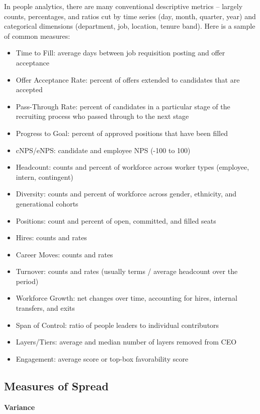 \documentclass[]{book}
\providecommand{\tightlist}{%
  \setlength{\itemsep}{0pt}\setlength{\parskip}{0pt}}
\begin{document}
In people analytics, there are many conventional descriptive metrics -- largely counts, percentages, and ratios cut by time series (day, month, quarter, year) and categorical dimensions (department, job, location, tenure band). Here is a sample of common measures:

\begin{itemize}
\tightlist
\item
  Time to Fill: average days between job requisition posting and offer acceptance
\item
  Offer Acceptance Rate: percent of offers extended to candidates that are accepted
\item
  Pass-Through Rate: percent of candidates in a particular stage of the recruiting process who passed through to the next stage
\item
  Progress to Goal: percent of approved positions that have been filled
\item
  cNPS/eNPS: candidate and employee NPS (-100 to 100)
\item
  Headcount: counts and percent of workforce across worker types (employee, intern, contingent)
\item
  Diversity: counts and percent of workforce across gender, ethnicity, and generational cohorts
\item
  Positions: count and percent of open, committed, and filled seats
\item
  Hires: counts and rates
\item
  Career Moves: counts and rates
\item
  Turnover: counts and rates (usually terms / average headcount over the period)
\item
  Workforce Growth: net changes over time, accounting for hires, internal transfers, and exits
\item
  Span of Control: ratio of people leaders to individual contributors
\item
  Layers/Tiers: average and median number of layers removed from CEO
\item
  Engagement: average score or top-box favorability score
\end{itemize}

\hypertarget{measures-of-spread}{%
\subsection{Measures of Spread}\label{measures-of-spread}}

\textbf{Variance}
\end{document}
